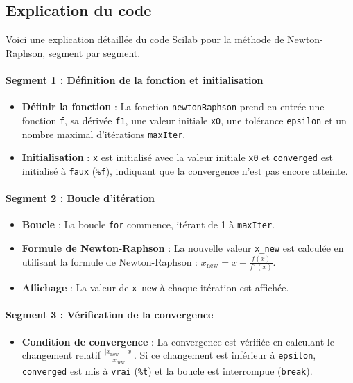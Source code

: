 \documentclass{article}
\begin{document}
\subsection{Explication du code}
Voici une explication détaillée du code Scilab pour la méthode de Newton-Raphson, segment par segment.

\paragraph{Segment 1 : Définition de la fonction et initialisation}
\begin{itemize}
    \item \textbf{Définir la fonction} : La fonction \texttt{newtonRaphson} prend en entrée une fonction \texttt{f}, sa dérivée \texttt{f1}, une valeur initiale \texttt{x0}, une tolérance \texttt{epsilon} et un nombre maximal d'itérations \texttt{maxIter}.
    \item \textbf{Initialisation} : \texttt{x} est initialisé avec la valeur initiale \texttt{x0} et \texttt{converged} est initialisé à \texttt{faux} (\texttt{\%f}), indiquant que la convergence n'est pas encore atteinte.
\end{itemize}

\paragraph{Segment 2 : Boucle d'itération}
\begin{itemize}
    \item \textbf{Boucle} : La boucle \texttt{for} commence, itérant de 1 à \texttt{maxIter}.
    \item \textbf{Formule de Newton-Raphson} : La nouvelle valeur \texttt{x\_new} est calculée en utilisant la formule de Newton-Raphson : \( x_{\text{new}} = x - \frac{f(x)}{f1(x)} \).
    \item \textbf{Affichage} : La valeur de \texttt{x\_new} à chaque itération est affichée.
\end{itemize}

\paragraph{Segment 3 : Vérification de la convergence}
\begin{itemize}
    \item \textbf{Condition de convergence} : La convergence est vérifiée en calculant le changement relatif \(\frac{|x_{\text{new}} - x|}{x_{\text{new}}}\). Si ce changement est inférieur à \texttt{epsilon}, \texttt{converged} est mis à \texttt{vrai} (\texttt{\%t}) et la boucle est interrompue (\texttt{break}).
\end{itemize}
\end{document}
